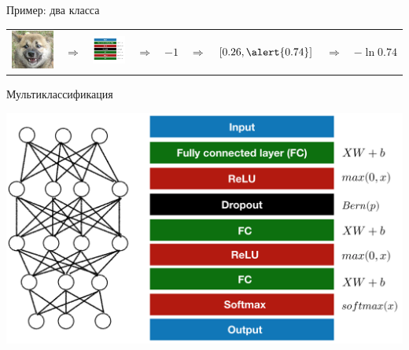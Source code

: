 \documentclass[notes,12pt, aspectratio=169]{beamer}
\begin{document}
\begin{frame}{Пример: два класса}
\begin{tabular}{m{2.5cm} m{0.35cm} m{1.8cm} m{0.35cm} m{0.5cm} m{0.35cm} m{2cm}  m{0.5cm} m{3.2cm}}
	\includegraphics[scale=0.2]{tab_dog.png}&  {\Large $\Rightarrow$} &  \includegraphics[scale=0.2]{tab_nn.png}  &  {\Large $\Rightarrow$}  &  $-1$ &  {\Large $\Rightarrow$}  &   $[0.26, \alert{0.74}]$ & {\Large $\Rightarrow$}  &  $-\ln 0.74$\\
\end{tabular}
\end{frame}


\begin{frame}{Мультиклассификация}
\begin{center}
	\includegraphics[width=0.75\paperwidth]{lego_nn_multi.png}
\end{center}
\end{frame}
\end{document}

